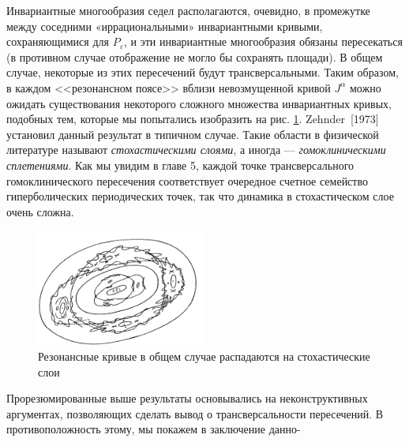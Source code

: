 \documentclass[twoside, a4paper]{article}
\begin{document}
Инвариантные многообразия седел располагаются, очевидно, в промежутке между соседними «иррациональными» инвариантными кривыми, сохраняющимися для $P_\varepsilon$, и эти инвариантные многообразия обязаны пересекаться (в противном случае отображение не могло бы сохранять площади). В общем случае, некоторые из этих пересечений будут трансверсальными. Таким образом, в каждом <<резонансном поясе>> вблизи невозмущенной
кривой $J^\alpha$ можно ожидать существования некоторого сложного множества инвариантных кривых, подобных тем, которые мы попытались изобразить на рис. \ref{fig:pic3}. Zehnder~[1973] установил данный результат в типичном случае. Такие области в физической литературе называют \emph{стохастическими слоями}, а иногда --- \emph{гомоклиническими сплетениями}. Как мы увидим в главе 5, каждой точке трансверсального гомоклинического пересечения соответствует очередное счетное семейство гиперболических периодических точек, так что динамика в стохастическом слое очень сложна.
\begin{figure}
\centering
\includegraphics[width=0.5\textwidth]{curves}
\caption{Резонансные кривые в общем случае распадаются на стохастические слои}
\label{fig:pic3}
\end{figure}

Прорезюмированные выше результаты основывались на неконструктивных аргументах, позволяющих сделать вывод о трансверсальности пересечений. В противоположность этому, мы покажем в заключение данно-
\end{document}
